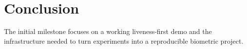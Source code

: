 \section{Conclusion}
The initial milestone focuses on a working liveness-first demo and the infrastructure needed to turn experiments into a reproducible biometric project.
